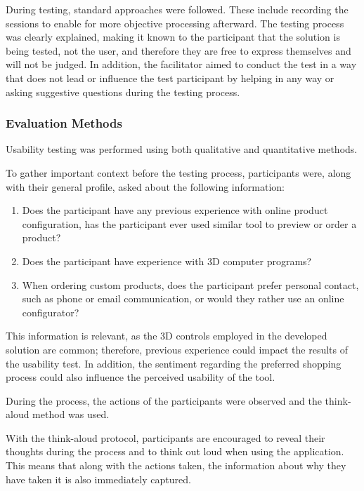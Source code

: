 During testing, standard approaches were followed. These include recording the sessions to enable for more objective processing afterward. The testing process was clearly explained, making it known to the participant that the solution is being tested, not the user, and therefore they are free to express themselves and will not be judged. In addition, the facilitator aimed to conduct the test in a way that does not lead or influence the test participant by helping in any way or asking suggestive questions during the testing process.~\cite{Moran2019}


\subsubsection{Evaluation Methods}

Usability testing was performed using both qualitative and quantitative methods.

To gather important context before the testing process, participants were, along with their general profile, asked about the following information: 
\begin{enumerate}
    \item Does the participant have any previous experience with online product configuration, has the participant ever used similar tool to preview or order a product?
    \item Does the participant have experience with 3D computer programs?
    \item When ordering custom products, does the participant prefer personal contact, such as phone or email communication, or would they rather use an online configurator?
\end{enumerate}
This information is relevant, as the 3D controls employed in the developed solution are common; therefore, previous experience could impact the results of the usability test. In addition, the sentiment regarding the preferred shopping process could also influence the perceived usability of the tool.

During the process, the actions of the participants were observed and the think-aloud method was used.

With the think-aloud protocol, participants are encouraged to reveal their thoughts during the process and to think out loud when using the application. This means that along with the actions taken, the information about why they have taken it is also immediately captured.~\cite{Moran2019}

